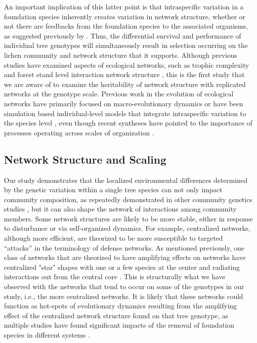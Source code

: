 \documentclass[fleqn,12pt]{olplainarticle}
\begin{document}
An important implication of this latter point is that intraspecific
variation in a foundation species inherently creates variation in
network structure, whether or not there are feedbacks from the
foundation species to the associated organisms, as suggested
previously by \cite{Lau2016afix}. Thus, the differential survival and
performance of individual tree genotypes will simultaneously result in
selection occurring on the lichen community and network structure that
it supports. Although previous studies have examined aspects of
ecological networks, such as trophic complexity
\citep{Barbour2016GeneticComplexity} and forest stand level
interaction network structure \citep{Lau2016GenotypicEvolution,
  Keith2017}, this is the first study that we are aware of to examine
the heritability of network structure with replicated networks at the
genotype scale. Previous work in the evolution of ecological networks
have primarily focused on macro-evolutionary dynamics
\citep{Rezende2007, Weber2017EvolutionMacroevolution,
  Valverde2018TheSpandrel, Harmon2019DetectingInteractions} or have
been simulation based individual-level models that integrate
intraspecific variation to the species level
\citep{Maliet2020AnNetworks}, even though recent syntheses have
pointed to the importance of processes operating across scales of
organization \citep{Guimaraes2020TheOrganization}.


\subsection*{Network Structure and Scaling}

Our study demonstrates that the localized environmental differences
determined by the genetic variation within a single tree species can
not only impact community composition, as repeatedly demonstrated in
other community genetics studies \citep{Whitham2006a,
  DesRoches2018TheVariation}, but it can also shape the network of
interactions among community members. Some network structures are
likely to be more stable, either in response to disturbance or via
self-organized dynamics. For example, centralized networks, although
more efficient, are theorized to be more susceptible to targeted
``attacks'' in the terminology of defense networks. As mentioned
previously, one class of networks that are theorized to have
amplifying effects on networks have centralized "star" shapes with one
or a few species at the center and radiating interactions out from the
central core \citep{Lieberman2005EvolutionaryGraphs}. This is
structurally what we have observed with the networks that tend to
occur on some of the genotypes in our study, i.e., the more
centralized networks. It is likely that these networks could function
as hot-spots of evolutionary dynamics resulting from the amplifying
effect of the centralized network structure found on that tree
genotype, as multiple studies have found significant impacts of the
removal of foundation species in different systems \citep{Keith2017,
  DesRoches2018TheVariation}.
\end{document}
